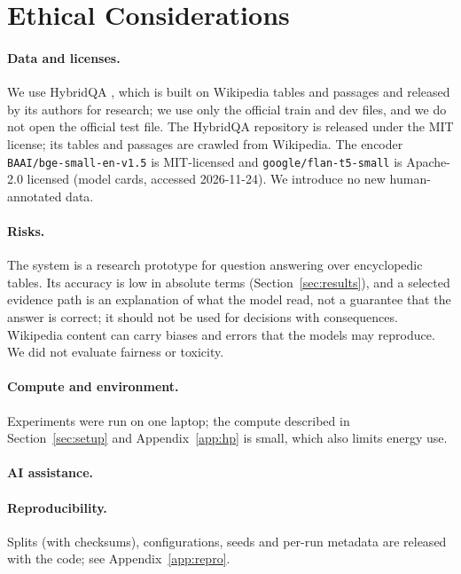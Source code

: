 \section*{Ethical Considerations}
\label{sec:ethics}

\paragraph{Data and licenses.}
We use HybridQA \citep{chen2020hybridqa}, which is built on Wikipedia tables and passages and released by its authors for research; we use only the official train and dev files, and we do not open the official test file. The HybridQA repository is released under the MIT license; its tables and passages are crawled from Wikipedia. The encoder \texttt{BAAI/bge-small-en-v1.5} is MIT-licensed and \texttt{google/flan-t5-small} is Apache-2.0 licensed (model cards, accessed 2026-11-24).
We introduce no new human-annotated data.

\paragraph{Risks.}
The system is a research prototype for question answering over encyclopedic tables.
Its accuracy is low in absolute terms (Section~\ref{sec:results}), and a selected evidence path is an explanation of what the model read, not a guarantee that the answer is correct; it should not be used for decisions with consequences.
Wikipedia content can carry biases and errors that the models may reproduce. We did not evaluate fairness or toxicity.

\paragraph{Compute and environment.}
Experiments were run on one laptop; the compute described in Section~\ref{sec:setup} and Appendix~\ref{app:hp} is small, which also limits energy use.

\paragraph{AI assistance.}

\paragraph{Reproducibility.}
Splits (with checksums), configurations, seeds and per-run metadata are released with the code; see Appendix~\ref{app:repro}.
